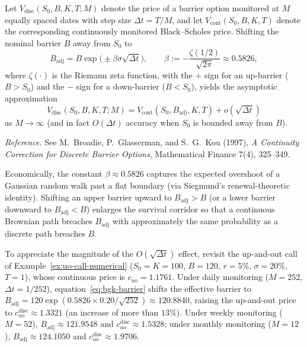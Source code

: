 \begin{proposition}\label{prop:bgk-continuity}
    Let $V_{\mathrm{disc}}(S_0, B, K, T; M)$ denote the price of a barrier option monitored at $M$ equally spaced dates with step size $\Delta t = T / M$, and let $V_{\mathrm{cont}}(S_0, B, K, T)$ denote the corresponding continuously monitored Black--Scholes price. Shifting the nominal barrier $B$ away from $S_0$ to
    \begin{equation}\label{eq:bgk-barrier}
        B_{\mathrm{adj}} = B \exp\bigl(\pm \beta \sigma \sqrt{\Delta t}\bigr), \qquad \beta := -\frac{\zeta(1/2)}{\sqrt{2\pi}} \approx 0.5826,
    \end{equation}
    where $\zeta(\cdot)$ is the Riemann zeta function, with the $+$ sign for an up-barrier ($B > S_0$) and the $-$ sign for a down-barrier ($B < S_0$), yields the asymptotic approximation
    \[
    V_{\mathrm{disc}}(S_0, B, K, T; M) = V_{\mathrm{cont}}(S_0, B_{\mathrm{adj}}, K, T) + o(\sqrt{\Delta t})
    \]
    as $M \to \infty$ (and in fact $O(\Delta t)$ accuracy when $S_0$ is bounded away from $B$).
\end{proposition}
\noindent\emph{Reference.} See M.~Broadie, P.~Glasserman, and S.~G.~Kou (1997), \emph{A Continuity Correction for Discrete Barrier Options}, Mathematical Finance 7(4), 325--349.

Economically, the constant $\beta \approx 0.5826$ captures the expected overshoot of a Gaussian random walk past a flat boundary (via Siegmund's renewal-theoretic identity). Shifting an upper barrier upward to $B_{\mathrm{adj}} > B$ (or a lower barrier downward to $B_{\mathrm{adj}} < B$) enlarges the survival corridor so that a continuous Brownian path breaches $B_{\mathrm{adj}}$ with approximately the same probability as a discrete path breaches $B$.

To appreciate the magnitude of the $O(\sqrt{\Delta t})$ effect, revisit the up-and-out call of Example~\ref{ex:uo-call-numerical} ($S_0 = K = 100$, $B = 120$, $r = 5\%$, $\sigma = 20\%$, $T = 1$), whose continuous price is $c_{uo} = 1.1761$. Under daily monitoring ($M = 252$, $\Delta t = 1/252$), equation~\eqref{eq:bgk-barrier} shifts the effective barrier to $B_{\mathrm{adj}} = 120\exp(0.5826 \times 0.20 / \sqrt{252}) \approx 120.8840$, raising the up-and-out price to $c_{uo}^{\mathrm{disc}} \approx 1.3321$ (an increase of more than $13\%$). Under weekly monitoring ($M = 52$), $B_{\mathrm{adj}} \approx 121.9548$ and $c_{uo}^{\mathrm{disc}} \approx 1.5328$; under monthly monitoring ($M = 12$), $B_{\mathrm{adj}} \approx 124.1050$ and $c_{uo}^{\mathrm{disc}} \approx 1.9706$.

